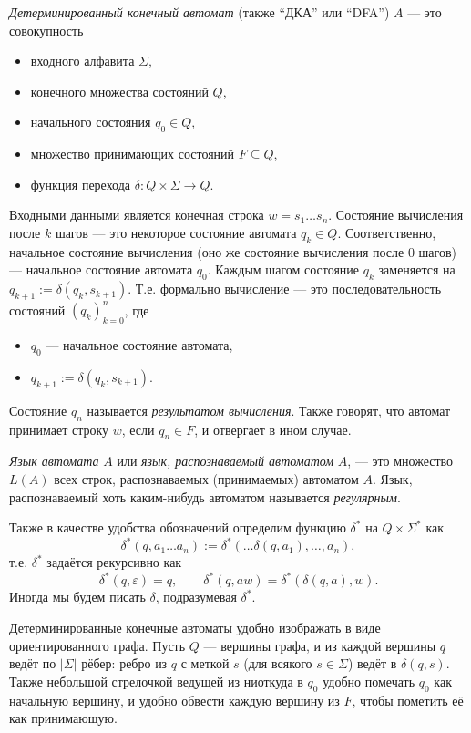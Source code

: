 \documentclass[12pt,a4paper]{article}
\begin{document}
    \begin{definition}
        \emph{Детерминированный конечный автомат} (также ``ДКА'' или ``DFA'') $A$ --- это совокупность
        \begin{itemize}
            \item входного алфавита $\Sigma$,
            \item конечного множества состояний $Q$,
            \item начального состояния $q_0 \in Q$,
            \item множество принимающих состояний $F \subseteq Q$,
            \item функция перехода $\delta: Q \times \Sigma \to Q$.
        \end{itemize}
        Входными данными является конечная строка $w = s_1 \dots s_n$. Состояние вычисления после $k$ шагов --- это некоторое состояние автомата $q_k \in Q$. Соответственно, начальное состояние вычисления (оно же состояние вычисления после $0$ шагов) --- начальное состояние автомата $q_0$. Каждым шагом состояние $q_k$ заменяется на $q_{k+1} := \delta(q_k, s_{k+1})$. Т.е. формально вычисление --- это последовательность состояний $(q_k)_{k=0}^n$, где
        \begin{itemize}
            \item $q_0$ --- начальное состояние автомата,
            \item $q_{k+1} := \delta(q_k, s_{k+1})$.
        \end{itemize}
        Состояние $q_n$ называется \emph{результатом вычисления}. Также говорят, что автомат принимает строку $w$, если $q_n \in F$, и отвергает в ином случае.

        \emph{Язык автомата} $A$ или \emph{язык, распознаваемый автоматом} $A$, --- это множество $L(A)$ всех строк, распознаваемых (принимаемых) автоматом $A$. Язык, распознаваемый хоть каким-нибудь автоматом называется \emph{регулярным}.

        Также в качестве удобства обозначений определим функцию $\delta^*$ на $Q \times \Sigma^*$ как
        \[\delta^*(q, a_1 \dots a_n) := \delta^*(\dots \delta(q, a_1), \dots, a_n),\]
        т.е. $\delta^*$ задаётся рекурсивно как
        \[\delta^*(q, \varepsilon) = q, \qquad \delta^*(q, aw) = \delta^*(\delta(q, a), w).\]
        Иногда мы будем писать $\delta$, подразумевая $\delta^*$.
    \end{definition}

    \begin{remark*}
        Детерминированные конечные автоматы удобно изображать в виде ориентированного графа. Пусть $Q$ --- вершины графа, и из каждой вершины $q$ ведёт по $|\Sigma|$ рёбер: ребро из $q$ с меткой $s$ (для всякого $s \in \Sigma$) ведёт в $\delta(q, s)$. Также небольшой стрелочкой ведущей из ниоткуда в $q_0$ удобно помечать $q_0$ как начальную вершину, и удобно обвести каждую вершину из $F$, чтобы пометить её как принимающую. 
    \end{remark*}
\end{document}
